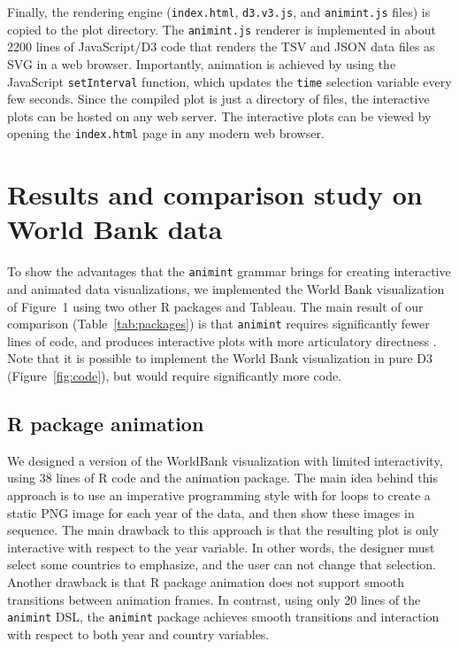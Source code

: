 \documentclass[journal]{vgtc}\usepackage[]{graphicx}\usepackage[]{color}
\begin{document}
Finally, the rendering engine (\texttt{index.html}, \texttt{d3.v3.js},
and \texttt{animint.js} files) is copied to the plot directory. The
\texttt{animint.js} renderer is implemented in about 2200 lines of
JavaScript/D3 code that renders the TSV and JSON data files as SVG in
a web browser. Importantly, animation is achieved by using the
JavaScript \texttt{setInterval} function, which updates the
\texttt{time} selection variable every few seconds. Since the compiled
plot is just a directory of files, the interactive plots can be hosted
on any web server. The interactive plots can be viewed by opening the
\texttt{index.html} page in any modern web browser.

\section{Results and comparison study on World Bank data}
\label{sec:compare}

To show the advantages that the \texttt{animint} grammar brings for creating
interactive and animated data visualizations, we implemented the World
Bank visualization of Figure~1 using two other R packages and Tableau. The main result of our comparison (Table~\ref{tab:packages}) is that
\texttt{animint} requires significantly fewer lines of code, and produces
interactive plots with more articulatory directness
\citep{Hutchins:1985}. Note that it is possible to implement the World
Bank visualization in pure D3 (Figure~\ref{fig:code}), but would
require significantly more code. %

\subsection{R package animation}
\label{sec:compare-animation}

We designed a version of the WorldBank visualization with limited
interactivity, using 38 lines of R code and the animation
package. The main idea behind this approach is to use an imperative
programming style with for loops to create a static PNG image for each
year of the data, and then show these images in sequence. The main
drawback to this approach is that the resulting plot is only
interactive with respect to the year variable. In other words, the
designer must select some countries to emphasize, and the user can not
change that selection. Another drawback is that R package
animation does not support smooth transitions between
animation frames. In contrast, using only 20 lines of the \texttt{animint} DSL,
the \texttt{animint} package achieves smooth transitions and interaction with
respect to both year and country variables.
\end{document}

